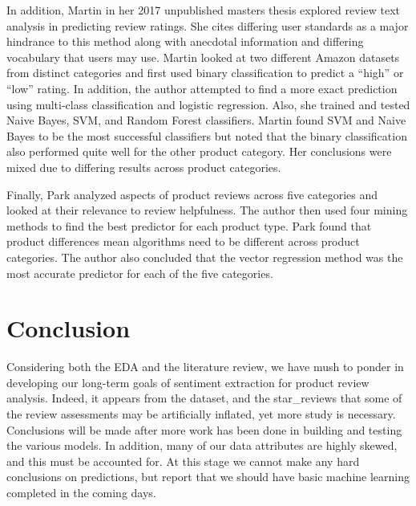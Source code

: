 \documentclass[10pt, conference, compsocconf]{IEEEtran}
\begin{document}
In addition, Martin \cite{master} in her 2017 unpublished masters thesis explored review text analysis in predicting review ratings. She cites differing user standards as a major hindrance to this method along with anecdotal information and differing vocabulary that users may use. Martin looked at two different Amazon datasets from distinct categories and first used binary classification to predict a “high” or “low” rating. In addition, the author attempted to find a more exact prediction using multi-class classification and logistic regression. Also, she trained and tested Naive Bayes, SVM, and Random Forest classifiers. Martin found SVM and Naive Bayes to be the most successful classifiers but noted that the binary classification also performed quite well for the other product category. Her conclusions were mixed due to differing results across product categories.

Finally, Park \cite{Yoon} analyzed aspects of product reviews across five categories and looked at their relevance to review helpfulness. The author then used four mining methods to find the best predictor for each product type. Park found that product differences mean algorithms need to be different across product categories. The author also concluded that the vector regression method was the most accurate predictor for each of the five categories.

\vspace{-0.01cm}
\section{Conclusion}\label{conclusion}
\vspace{-0.01cm}

Considering both the EDA and the literature review, we have mush to ponder in developing our long-term goals of sentiment extraction for product review analysis. Indeed, it appears from the dataset, and the star\_reviews that some of the review assessments may be artificially inflated, yet more study is necessary. Conclusions will be made after more work has been done in building and testing the various models. In addition, many of our data attributes are highly skewed, and this must be accounted for. At this stage we cannot make any hard conclusions on predictions, but report that we should have basic machine learning completed in the coming days.


\vspace{-0.01cm}

\end{document}
